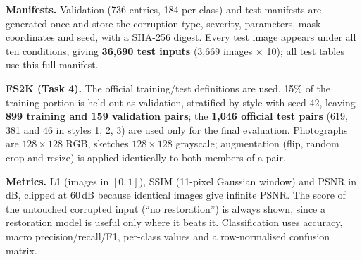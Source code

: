 \textbf{Manifests.} Validation (736 entries, 184 per class) and test manifests are generated once and store the corruption type, severity, parameters, mask coordinates and seed, with a SHA-256 digest. Every test image appears under all ten conditions, giving \textbf{36,690 test inputs} (3,669 images $\times$ 10); all test tables use this full manifest.

\textbf{FS2K (Task 4).} The official training/test definitions are used. 15\% of the training portion is held out as validation, stratified by style with seed 42, leaving \textbf{899 training and 159 validation pairs}; the \textbf{1,046 official test pairs} (619, 381 and 46 in styles 1, 2, 3) are used only for the final evaluation. Photographs are $128\times128$ RGB, sketches $128\times128$ grayscale; augmentation (flip, random crop-and-resize) is applied identically to both members of a pair.

\textbf{Metrics.} L1 (images in $[0,1]$), SSIM (11-pixel Gaussian window) and PSNR in dB, clipped at 60\,dB because identical images give infinite PSNR. The score of the untouched corrupted input (``no restoration'') is always shown, since a restoration model is useful only where it beats it. Classification uses accuracy, macro precision/recall/F1, per-class values and a row-normalised confusion matrix.
